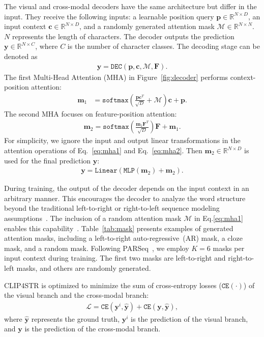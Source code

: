 \documentclass[lettersize,journal]{IEEEtran}
\begin{document}
The visual and cross-modal decoders have the same architecture but differ in the input.
They receive the following inputs: a learnable position query
$\bm{p} \in \mathbb{R}^{N\times D}$,
an input context $\bm{c} \in \mathbb{R}^{N\times D}$,
and a randomly generated attention mask
$\mathcal{M} \in \mathbb{R}^{N\times N}$.
$N$ represents the length of characters.
The decoder outputs the prediction
$\bm{y} \in \mathbb{R}^{N\times C}$, where $C$ is the number of character classes.
The decoding stage can be denoted as
\begin{align}
    \bm{y} = \texttt{DEC}(\bm{p}, \bm{c}, \mathcal{M}, \bm{F}).
\end{align}
The first Multi-Head Attention (MHA) in Figure~\ref{fig:decoder} performs context-position attention:
\begin{align}
    \bm{m}_1 &= \texttt{softmax}(\frac{\bm{p}\bm{c}^T}{\sqrt{D}} + \mathcal{M})\bm{c} + \bm{p}. \label{eq:mha1}
\end{align}
The second MHA focuses on feature-position attention:
\begin{align}
    \bm{m}_2 = \texttt{softmax}(\frac{\bm{m}_1\bm{F}^T}{\sqrt{D}})\bm{F} + \bm{m}_1. \label{eq:mha2}
\end{align}
For simplicity, we ignore the input and output linear transformations in the attention operations of Eq.~\eqref{eq:mha1}
and Eq.~\eqref{eq:mha2}.
Then $\bm{m}_2 \in \mathbb{R}^{N\times D}$ is used for the final prediction $\bm{y}$:
\begin{align}
    \bm{y} = \texttt{Linear}(\texttt{MLP}(\bm{m}_2) + \bm{m}_2).
\end{align}

During training, the output of the decoder depends on the input context in an arbitrary manner.
This encourages the decoder to analyze the word structure beyond the traditional left-to-right or right-to-left sequence modeling assumptions~\cite{2021_abinet}. 
The inclusion of a random attention mask $\mathcal{M}$ in Eq.\eqref{eq:mha1} enables this capability~\cite{2022_parseq}. 
Table~\ref{tab:mask} presents examples of generated attention masks, including a left-to-right auto-regressive~(AR) mask, a cloze mask, and a random mask.
Following PARSeq~\cite{2022_parseq}, we employ $K=6$ masks per input context during training.
The first two masks are left-to-right and right-to-left masks, and others are randomly generated.

CLIP4STR is optimized to minimize the sum of cross-entropy losses ($\texttt{CE}(\cdot)$) of the visual branch and the cross-modal branch:
\begin{align}
    \mathcal{L} = \texttt{CE}(\bm{y}^i, \hat{\bm{y}}) + \texttt{CE}(\bm{y}, \hat{\bm{y}}),
\end{align}
where $\hat{\bm{y}}$ represents the ground truth,
$\bm{y}^i$ is the prediction of the visual branch,
and $\bm{y}$ is the prediction of the cross-modal branch.
\end{document}
